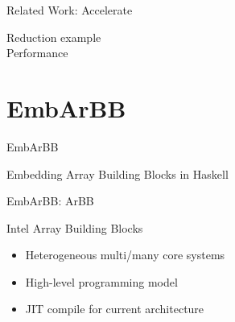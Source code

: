 \documentclass[xcolor=dvipsnames]{beamer}
\begin{document}
\begin{frame}{Related Work: Accelerate}
\begin{center}



\end{center}
\end{frame} 

%

\begin{frame}{}
  Reduction example \\
  Performance
\end{frame} 
    



%
\section{EmbArBB} 

\begin{frame}{EmbArBB} 
 \begin{center}
   {\Large Embedding Array Building Blocks in Haskell}
 \end{center}

\end{frame} 

%

\begin{frame}{EmbArBB: ArBB} 

  Intel Array Building Blocks
  \begin{itemize}
    \item Heterogeneous multi/many core systems
    \item High-level programming model 
    \item JIT compile for current architecture   
  \end{itemize}
\end{frame} 
\end{document}
